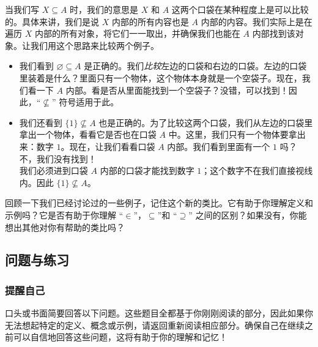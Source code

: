 当我们写 $X \subseteq A$ 时，我们的意思是 $X$ 和 $A$ 这两个口袋在某种程度上是可以比较的。具体来讲，我们是说 $X$ 内部的所有内容也是 $A$ 内部的内容。我们实际上是在遍历 $X$ 内部的所有对象，将它们一一取出，并确保我们也能在 $A$ 内部找到该对象。让我们用这个思路来比较两个例子。

\begin{itemize}
    \item 我们看到 ${\varnothing} \subseteq A$ 是正确的。我们\emph{比较}左边的口袋和右边的口袋。左边的口袋里装着是什么？里面只有一个物体，这个物体本身就是一个空袋子。现在，我们看一下 $A$ 内部。看是否从里面能找到一个空袋子？没错，可以找到！因此，``$\nsubseteq$'' 符号适用于此。
    \item 我们还看到 $\{1\} \nsubseteq A$ 也是正确的。为了比较这两个口袋，我们从左边的口袋里拿出一个物体，看看它是否也在口袋 $A$ 中。这里，我们只有一个物体要拿出来：数字 $1$。现在，让我们看看口袋 $A$ 内部。我们看到里面有一个 $1$ 吗？ 不，我们没有找到！\\
    我们必须进到口袋 $A$ 内部的口袋才能找到数字 $1$；这个数字不在我们直接视线内。因此 $\{1\} \nsubseteq A$。
\end{itemize}

回顾一下我们已经讨论过的一些例子，记住这个新的类比。它有助于你理解定义和示例吗？它是否有助于你理解 ``$\in$''，$\subseteq$''和 ``$\supseteq$'' 之间的区别？如果没有，你能想出其他对你有帮助的类比吗？

\subsection{问题与练习}

\subsubsection*{提醒自己}

口头或书面简要回答以下问题。这些题目全都基于你刚刚阅读的部分，因此如果你无法想起特定的定义、概念或示例，请返回重新阅读相应部分。确保自己在继续之前可以自信地回答这些问题，这将有助于你的理解和记忆！

